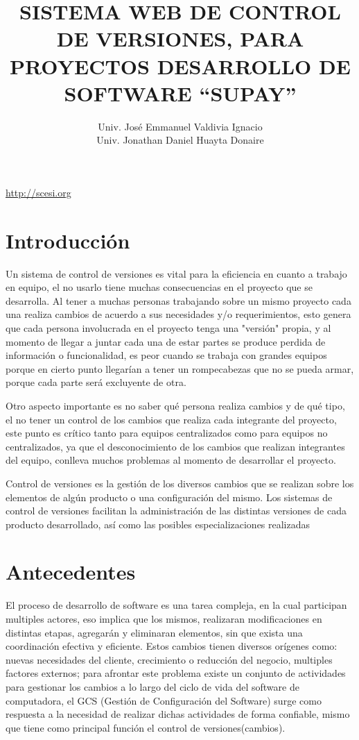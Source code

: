 \documentclass[letterpaper,11pt]{article}
\title{\bf SISTEMA WEB DE  CONTROL DE VERSIONES, PARA PROYECTOS DESARROLLO DE SOFTWARE “SUPAY”}
\author{
    Univ. José Emmanuel Valdivia Ignacio \\
    Univ. Jonathan Daniel Huayta Donaire
}
\begin{document}
\maketitle
\begin{center}\url {http://scesi.org}\end{center}
\pagebreak

\tableofcontents
\pagebreak

\section{Introducción}
Un sistema de control de versiones es vital para la eficiencia en cuanto a trabajo en equipo, el no usarlo tiene muchas consecuencias en el proyecto que se desarrolla. Al tener a muchas personas trabajando sobre un mismo proyecto cada una realiza cambios de acuerdo a sus necesidades y/o requerimientos, esto genera que cada persona involucrada en el proyecto tenga una "versión" propia, y al momento de llegar a juntar cada una de estar partes se produce perdida de información o funcionalidad, es peor cuando se trabaja con grandes equipos porque en cierto punto llegarían a tener un rompecabezas que no se pueda armar, porque cada parte será excluyente de otra.

Otro aspecto importante es no saber qué persona realiza cambios y de qué tipo, el no tener un control de los cambios que realiza cada integrante del proyecto, este punto es crítico tanto para equipos centralizados como para equipos no centralizados, ya que el desconocimiento de los cambios que realizan integrantes del equipo, conlleva muchos problemas al momento de desarrollar el proyecto. 

Control  de versiones es la gestión de los diversos cambios que se realizan sobre los elementos de algún producto o una configuración del mismo. Los sistemas de control de versiones facilitan la administración de las distintas versiones de cada producto desarrollado, así como las posibles especializaciones realizadas
\section{Antecedentes}
El proceso de desarrollo de software es una tarea compleja, en la cual participan multiples actores, eso implica que los mismos, realizaran modificaciones en distintas etapas, agregarán y eliminaran elementos, sin que exista una coordinación efectiva y eficiente. Estos cambios tienen diversos orígenes como: nuevas necesidades del cliente, crecimiento o reducción del negocio, multiples factores externos; para afrontar este problema existe un conjunto de actividades para gestionar los cambios a lo largo del ciclo de vida del software de computadora, el GCS (Gestión de Configuración del Software) surge como respuesta a la necesidad de realizar dichas actividades de forma confiable, mismo que tiene como principal función el control de versiones(cambios).
\end{document}
